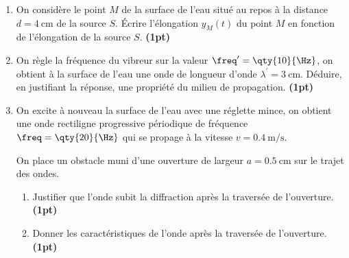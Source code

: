 \begin{enumerate}
\begin{minipage}[t][][t]{0.26\linewidth}
\begin{figure}[H]
              \end{figure}
          \end{minipage}

    \item On considère le point $M$ de la surface de l'eau situé au repos à la
          distance $d=\qty{4}{\cm}$ de la source $S$. Écrire l'élongation
          $y_{M}(t)$ du point $M$ en fonction de l'élongation de la source $S$.
          \textbf{(1pt)}
  
    \item On règle la fréquence du vibreur sur la valeur
          $\freq^{\prime}=\qty{10}{\Hz}$, on obtient à la surface de l'eau une onde
          de longueur d'onde $\lambda^{\prime}=\qty{3}{\cm}$. Déduire, en
          justifiant la réponse, une propriété du milieu de propagation.
          \textbf{(1pt)}
    \item On excite à nouveau la surface de l'eau avec une réglette mince, on
          obtient une onde rectiligne progressive périodique de fréquence
          $\freq=\qty{20}{\Hz}$ qui se propage à la vitesse
          $v=\qty{0.4}{\m\per\s}$.

          On place un obstacle muni d'une ouverture de largeur
          $a=\qty{0.5}{\cm}$ sur le trajet des ondes.
          \begin{enumerate}
              \item Justifier que l'onde subit la diffraction après la traversée
                    de l'ouverture.
                    \textbf{(1pt)}
              \item Donner les caractéristiques de l'onde après la traversée de
                    l'ouverture.
                    \textbf{(1pt)}
          \end{enumerate}
\end{enumerate}

